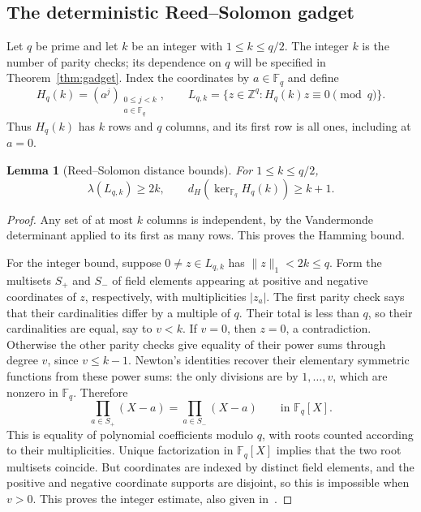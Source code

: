 \documentclass[11pt,letterpaper]{article}
\numberwithin{equation}{section}
\newtheorem{lemma}[theorem]{Lemma}
\theoremstyle{definition}
\theoremstyle{remark}
\newcommand{\Z}{\mathbb Z}
\newcommand{\F}{\mathbb F}
\begin{document}
\subsection{The deterministic Reed--Solomon gadget}
Let $q$ be prime and let $k$ be an integer with $1\le k\le q/2$. The integer $k$ is the number of parity checks; its dependence on $q$ will be specified in Theorem~\ref{thm:gadget}. Index the coordinates by $a\in\F_q$ and define
\begin{equation}\label{eq:rs-definition}
 H_q(k)=(a^j)_{\substack{0\le j<k\\a\in\F_q}},
 \qquad
 L_{q,k}=\{z\in\Z^q:H_q(k)z\equiv0\pmod q\}.
\end{equation}
Thus $H_q(k)$ has $k$ rows and $q$ columns, and its first row is all ones, including at $a=0$.

\begin{lemma}[Reed--Solomon distance bounds]\label{lem:rs}
For $1\le k\le q/2$,
\[
 \lambda(L_{q,k})\ge2k,
 \qquad d_H(\ker_{\F_q}H_q(k))\ge k+1.
\]
\end{lemma}
\begin{proof}
Any set of at most $k$ columns is independent, by the Vandermonde determinant applied to its first as many rows. This proves the Hamming bound.

For the integer bound, suppose $0\ne z\in L_{q,k}$ has $\|z\|_1<2k\le q$. Form the multisets $S_+$ and $S_-$ of field elements appearing at positive and negative coordinates of $z$, respectively, with multiplicities $|z_a|$. The first parity check says that their cardinalities differ by a multiple of $q$. Their total is less than $q$, so their cardinalities are equal, say to $v<k$. If $v=0$, then $z=0$, a contradiction. Otherwise the other parity checks give equality of their power sums through degree $v$, since $v\le k-1$. Newton's identities recover their elementary symmetric functions from these power sums: the only divisions are by $1,\ldots,v$, which are nonzero in $\F_q$. Therefore
\[
 \prod_{a\in S_+}(X-a)=\prod_{a\in S_-}(X-a)
 \qquad\text{in }\F_q[X].
\]
This is equality of polynomial coefficients modulo $q$, with roots counted according to their multiplicities. Unique factorization in $\F_q[X]$ implies that the two root multisets coincide. But coordinates are indexed by distinct field elements, and the positive and negative coordinate supports are disjoint, so this is impossible when $v>0$. This proves the integer estimate, also given in~\cite[Theorem 14]{bp}.
\end{proof}
\end{document}
